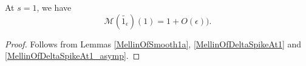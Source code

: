 \begin{lemma}[MellinOfSmooth1c]
\label{MellinOfSmooth1c}
\leanok
At $s=1$, we have
  $$\mathcal{M}(\widetilde{1_{\epsilon}})(1) = 1+O(\epsilon)).$$
\end{lemma}
\begin{proof}
\leanok
Follows from Lemmas \ref{MellinOfSmooth1a}, \ref{MellinOfDeltaSpikeAt1} and
  \ref{MellinOfDeltaSpikeAt1_asymp}.
\end{proof}
